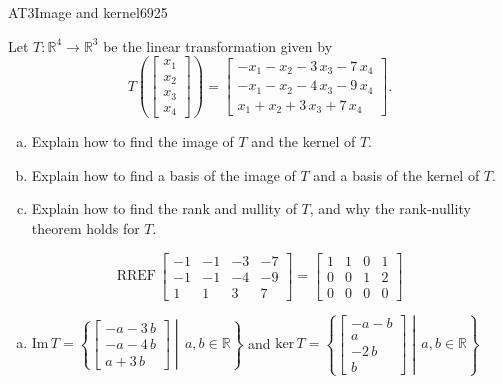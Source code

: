 \begin{exercise}{AT3}{Image and kernel}{6925} 
\begin{exerciseStatement} 

 Let \(T:\mathbb{R}^4 \to \mathbb{R}^3\) be the linear transformation given by \[T\left( \left[\begin{array}{c}
x_{1} \\
x_{2} \\
x_{3} \\
x_{4}
\end{array}\right] \right) = \left[\begin{array}{c}
-x_{1} - x_{2} - 3 \, x_{3} - 7 \, x_{4} \\
-x_{1} - x_{2} - 4 \, x_{3} - 9 \, x_{4} \\
x_{1} + x_{2} + 3 \, x_{3} + 7 \, x_{4}
\end{array}\right].\] 

 

\begin{enumerate}[(a)]
\item Explain how to find the image of \(T\) and the kernel of \(T\).
\item Explain how to find a basis of the image of \(T\) and a basis of the kernel of \(T\).
\item Explain how to find the rank and nullity of \(T\), and why the rank-nullity theorem holds for \(T\).
\end{enumerate}

     \end{exerciseStatement}
 \begin{exerciseAnswer} 

\[\mathrm{RREF}\,\left[\begin{array}{cccc}
-1 & -1 & -3 & -7 \\
-1 & -1 & -4 & -9 \\
1 & 1 & 3 & 7
\end{array}\right]=\left[\begin{array}{cccc}
1 & 1 & 0 & 1 \\
0 & 0 & 1 & 2 \\
0 & 0 & 0 & 0
\end{array}\right]\]

 

\begin{enumerate}[(a)]
\item  

 \(\mathrm{Im}\,T =  \left\{ \left[\begin{array}{c}
-a - 3 \, b \\
-a - 4 \, b \\
a + 3 \, b
\end{array}\right] \middle|\,a,b\in\mathbb{R}\right\}\) and \(\mathrm{ker}\,T = \left\{ \left[\begin{array}{c}
-a - b \\
a \\
-2 \, b \\
b
\end{array}\right] \middle|\,a,b\in\mathbb{R}\right\}\) 


\end{enumerate}
\end{exerciseAnswer}
\end{exercise}
